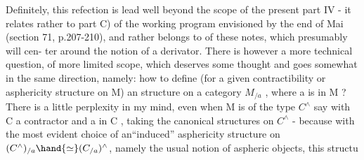 Definitely,  this refection is   lead well beyond the
scope of the present part IV -  it relates rather to part C) of the
working program envisioned by the end of Mai (section 71,  p.207-210),
\margin{$\times$} and rather belongs to \hand{\uline{\textcolor{black}{part VI}}} of these notes,  which presumably will cen-%
ter around the notion of a derivator.  %
There is  however a more technical
question,  of more limited scope,  which deserves some thought and goes
somewhat in the same direction,  namely:  how to define (for a given
contractibility or asphericity structure on M) an \hand{\uline{\textcolor{black}{induced}}} structure on
a category $M_{/a}$ ,  where a is in M ?   There is a little perplexity in
my mind,  even when M is of the type $C^{\wedge}$ say\hand{,} with C a contractor\hand{,} and a 
in C ,  taking the canonical structures on $C^{\wedge}$ -  because with the most
evident choice of an``induced''  asphericity structure on $(C^{\wedge})_{/a} \hand{\simeq} (C_{/a})^{\wedge}$,
 namely the usual notion of aspheric objects,  this structu

